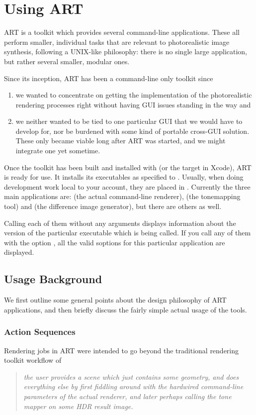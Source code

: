 \chapter{Using ART}
\label{sec:usingart}

ART is a toolkit which provides several command-line
applications. These all perform smaller, individual tasks that are relevant to
photorealistic image synthesis, following a UNIX-like philosophy: there is no single large application, but rather several smaller, modular ones.

Since its inception, ART has been a command-line only toolkit since
\begin{enumerate}
\item we wanted to concentrate on getting the implementation of the
  photorealistic rendering processes right without having GUI issues standing
  in the way and
\item we neither wanted to be tied to one particular GUI that we would have to
  develop for, nor be burdened with some kind of portable cross-GUI solution.
  These only became viable long after ART was started, and we might integrate
  one yet sometime.
\end{enumerate}

Once the toolkit has been built and installed with  (or the  target in Xcode), ART
is ready for use. It installs its executables as specified to . Usually, when doing development work local to your account, they are placed in . Currently the three main applications are:  (the actual command-line renderer),  (the
tonemapping tool) and  (the difference image generator), but there are others as well.


Calling each of them without any arguments displays information about the version of the particular executable which is being called. If you call any of them with the option , all the valid soptions for this particular application are displayed.

\section{Usage Background}
We first outline some general points about the design philosophy of ART applications, and then briefly discuss the fairly simple actual usage of the tools.

\subsection{Action Sequences}
\label{sec:using:ActionSequence}
Rendering jobs in ART were intended to go beyond the traditional rendering toolkit workflow of
\begin{quote}\itshape
the user provides a scene which just contains some geometry, and does
  everything else by first fiddling around with the hardwired command-line
  parameters of the actual renderer, and later perhaps calling the tone mapper
  on some HDR result image.
\end{quote}


